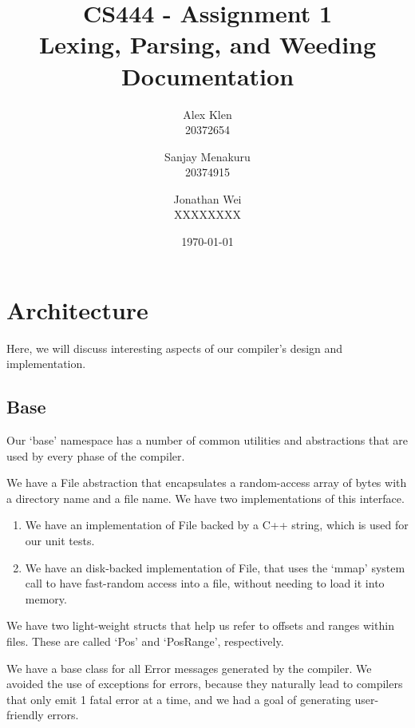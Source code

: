 \documentclass[12pt, titlepage]{article}
\newcommand{\assignmentNumber}{Assignment 1}
\newcommand{\courseName}{CS 444}
\begin{document}
\pagestyle{fancyplain}
\thispagestyle{plain}

\fancyhead{}
\fancyfoot{}
\chead{\fancyplain{}{\assignmentNumber}}
\lhead{\fancyplain{}{\courseName}}

\title{CS444 - \assignmentNumber\\Lexing, Parsing, and Weeding Documentation}
\date{\today}
\author{Alex Klen\\20372654\and Sanjay Menakuru\\20374915\and Jonathan Wei\\XXXXXXXX}

\maketitle

\section{Architecture}
Here, we will discuss interesting aspects of our compiler's design and
implementation.

\subsection{Base}
Our `base' namespace has a number of common utilities and abstractions that are
used by every phase of the compiler.

We have a File abstraction that encapsulates a random-access array of bytes
with a directory name and a file name. We have two implementations of this
interface.

\begin{enumerate}
  \item
  We have an implementation of File backed by a C++ string, which is used for
  our unit tests.
  \item
  We have an disk-backed implementation of File, that uses the `mmap' system
  call to have fast-random access into a file, without needing to load it into
  memory.
\end{enumerate}

We have two light-weight structs that help us refer to offsets and ranges
within files. These are called `Pos' and `PosRange', respectively.

We have a base class for all Error messages generated by the compiler. We
avoided the use of exceptions for errors, because they naturally lead to
compilers that only emit 1 fatal error at a time, and we had a goal of
generating user-friendly errors.
\end{document}
